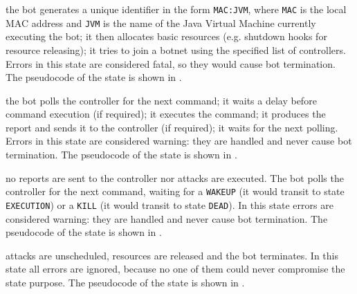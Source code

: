 \begin{description}
  \setlength\itemsep{1em}

  \item[INIT] the bot generates a unique identifier in the form \texttt{MAC:JVM}, where \texttt{MAC} is the local MAC address and \texttt{JVM} is the name of the Java Virtual Machine currently executing the bot; it then allocates basic resources (e.g. shutdown hooks for resource releasing); it tries to join a botnet using the specified list of controllers.
  Errors in this state are considered fatal, so they would cause bot termination. The pseudocode of the state is shown in .

  \item[EXECUTION] the bot polls the controller for the next command; it waits a delay before command execution (if required); it executes the command; it produces the report and sends it to the controller (if required); it waits for the next polling.
  Errors in this state are considered warning: they are handled and never cause bot termination. The pseudocode of the state is shown in .

  \item[SLEEP] no reports are sent to the controller nor attacks are executed. The bot polls the controller for the next command, waiting for a \texttt{WAKEUP} (it would transit to state \texttt{EXECUTION}) or a \texttt{KILL} (it would transit to state \texttt{DEAD}).
  In this state errors are considered warning: they are handled and never cause bot termination. The pseudocode of the state is shown in .

  \item[DEAD] attacks are unscheduled, resources are released and the bot terminates. In this state all errors are ignored, because no one of them could never compromise the state purpose. The pseudocode of the state is shown in .

\end{description}

\bigskip

